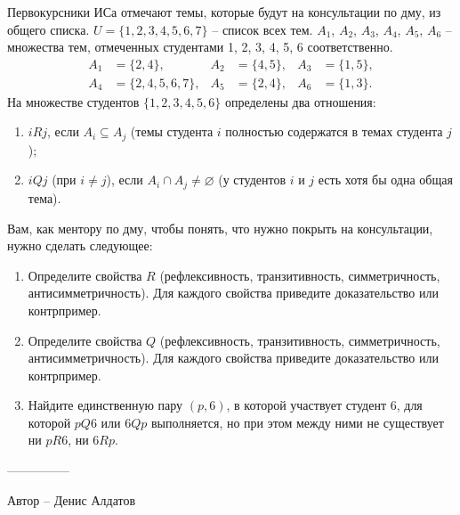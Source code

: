\question
Первокурсники ИСа отмечают темы, которые будут на консультации по дму, из общего списка. $U = \{1, 2, 3, 4, 5, 6, 7\}$ -- список всех тем. $A_1$, $A_2$, $A_3$, $A_4$, $A_5$, $A_6$ -- множества тем, отмеченных студентами 1, 2, 3, 4, 5, 6 соответственно.
\\
\begin{align*}
    A_1 &= \{2, 4\}, & A_2 &= \{4, 5\}, & A_3 &= \{1, 5\}, \\
    A_4 &= \{2, 4, 5, 6, 7\}, & A_5 &= \{2, 4\}, & A_6 &= \{1, 3\}.
\end{align*}
На множестве студентов $\{1, 2, 3, 4, 5, 6\}$ определены два отношения:
\begin{enumerate}
    \renewcommand{\labelenumi}{\arabic{enumi})}
    \item $iRj$, если $A_i \subseteq A_j$ (темы студента $i$ полностью содержатся в темах студента $j$);
    \item $iQj$ (при $i \ne j$), если $A_i \cap A_j \ne \varnothing$ (у студентов $i$ и $j$ есть хотя бы одна общая тема).
\end{enumerate}
Вам, как ментору по дму, чтобы понять, что нужно покрыть на консультации, нужно сделать следующее:
\begin{enumerate}
    \renewcommand{\labelenumi}{\alph{enumi})}
    \item Определите свойства $R$ (рефлексивность, транзитивность, симметричность, антисимметричность). Для каждого свойства приведите доказательство или контрпример.
    \item Определите свойства $Q$ (рефлексивность, транзитивность, симметричность, антисимметричность). Для каждого свойства приведите доказательство или контрпример.
    \item Найдите единственную пару $(p, 6)$, в которой участвует студент 6, для которой $pQ6$ или $6Qp$ выполняется, но при этом между ними не существует ни $pR6$, ни $6Rp$.
\end{enumerate}

---------------

Автор -- Денис Алдатов
